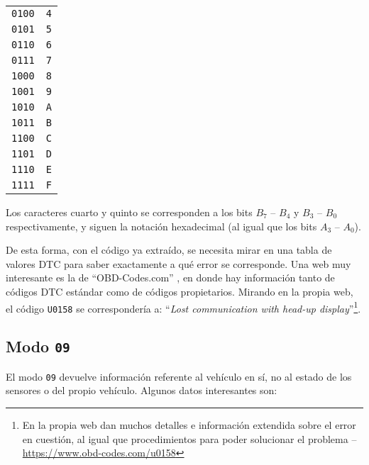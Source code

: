 \begin{table}[H]
\begin{minipage}{.32\linewidth}
\begin{tabularx}{\textwidth}{|C{.3}|C{.7}|}
      \texttt{0100}             & \texttt{4}                        \\
      \texttt{0101}             & \texttt{5}                        \\
      \texttt{0110}             & \texttt{6}                        \\
      \texttt{0111}             & \texttt{7}                        \\
      \texttt{1000}             & \texttt{8}                        \\
      \texttt{1001}             & \texttt{9}                        \\
      \texttt{1010}             & \texttt{A}                        \\
      \texttt{1011}             & \texttt{B}                        \\
      \texttt{1100}             & \texttt{C}                        \\
      \texttt{1101}             & \texttt{D}                        \\
      \texttt{1110}             & \texttt{E}                        \\
      \texttt{1111}             & \texttt{F}                        \\
      \hline
    \end{tabularx}
  \end{minipage}
\end{table}

Los caracteres cuarto y quinto se corresponden a los bits $B_7$ -- $B_4$ y $B_3$ -- $B_0$
respectivamente, y siguen la notación hexadecimal (al igual que los bits $A_3$ -- $A_0$).

De esta forma, con el código ya extraído, se necesita mirar en una tabla de valores
\ac{DTC} para saber exactamente a qué error se corresponde. Una web muy interesante
es la de ``OBD-Codes.com'' \cite{OBDCodesComLeading}, en donde hay información tanto
de códigos \ac{DTC} estándar como de códigos propietarios. Mirando en la propia
web, el código \texttt{U0158} se correspondería a: ``\textit{Lost communication with
head-up display}''\footnote{En la propia web dan muchos detalles e información
extendida sobre el error en cuestión, al igual que procedimientos para poder
solucionar el problema -- \url{https://www.obd-codes.com/u0158}}.

\subsection*{Modo \texttt{09}}
El modo \texttt{09} devuelve información referente al vehículo en sí, no al estado
de los sensores o del propio vehículo. Algunos datos interesantes son:

